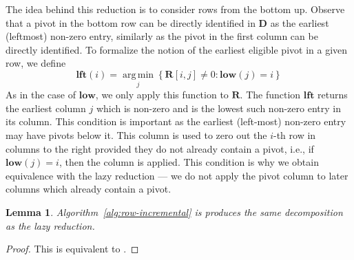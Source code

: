 \documentclass{article}
\newtheorem{lemma}[theorem]{Lemma}
\newcommand{\mat}[1]{\mathbf{#1}}
\newcommand{\low}{\mathbf{low}}
\newcommand{\lft}{\mathbf{lft}}
\newcommand{\Remark}[1]{\textcolor{blue}{[#1]}}
\DeclareMathOperator*{\argmin}{arg\,min}
\begin{document}
The idea behind this reduction is to consider rows from the bottom up. Observe that a pivot in the bottom row can be directly identified in $\mat{D}$ as the earliest (leftmost) non-zero entry, similarly as the pivot in the first column can be directly identified. To formalize the notion of the earliest eligible pivot in a given row, we define
\[
    \lft(i) = \argmin\limits_j \left\{ \mat{R}[i,j]\neq 0 :  \low(j) = i \right\} %
\]
As in the case of $\low$, we only apply this function to $\mat{R}$. The function $\lft $ returns the earliest column $j$ which is non-zero and is the lowest such non-zero entry in its column.  This condition is important as the earliest (left-most) non-zero entry may have pivots below it. This column is used to zero out the $i$-th row in columns to the right provided they do not already contain a pivot, i.e., if $\low(j)=i$, then the column is applied.  This condition is why we obtain equivalence with the lazy reduction ---  we do not apply the pivot column to later columns which already contain a pivot. 
\begin{lemma}
    Algorithm~\ref{alg:row-incremental} is produces the same decomposition as the lazy reduction.%
\end{lemma}
\begin{proof}
This is equivalent to \cite[Theorem 3.1]{de2011dualities}.
\end{proof}
\end{document}
